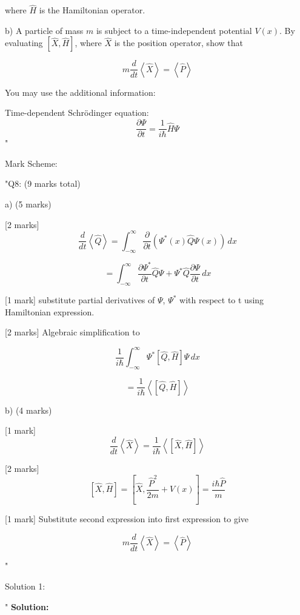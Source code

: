 where \( \hat{H} \) is the Hamiltonian operator. 

b) A particle of mass \( m \) is subject to a time-independent potential \( V(x) \). By evaluating \( \left[ \hat{X}, \hat{H}\right] \), where \( \hat{X} \) is the position operator, show that 

\[ m\frac{d}{dt}\left<\hat{X}\right> = \left<\hat{P}\right> \]

You may use the additional information: 

Time-dependent Schrödinger equation: 
\[ \frac{\partial\Psi}{\partial t} = \frac{1}{i\hbar}\hat{H}\Psi \]"

Mark Scheme:

"{Q8: (9 marks total) }

a) (5 marks)

[2 marks] \[ \frac{d}{dt} \left< \hat{Q} \right> = \int_{-\infty}^{\infty} \frac{\partial}{\partial t} \left( \Psi^{*}(x) \hat{Q} \Psi(x) \right) \, dx \]

\[ = \int_{-\infty}^{\infty} \frac{\partial \Psi^{*}}{\partial t}\hat{Q}\Psi + \Psi^{*}\hat{Q}\frac{\partial \Psi}{\partial t} \, dx \]

[1 mark] substitute partial derivatives of \(\Psi\), \(\Psi^{*}\) with respect to t using Hamiltonian expression.

[2 marks] Algebraic simplification to 

\[ \frac{1}{i\hbar} \int_{-\infty}^{\infty} \Psi^{*} \left [ \hat{Q}, \hat{H} \right ] \Psi \, dx \]

\[ = \frac{1}{i\hbar} \left<  \left [ \hat{Q}, \hat{H} \right ] \right> \]

b) (4 marks)

[1 mark]\[ \frac{d}{dt}  \left<\hat{X}\right> = \frac{1}{i\hbar}\left< \left[ \hat{X}, \hat{H} \right] \right> \] 

[2 marks] \[\left[ \hat{X}, \hat{H}\right] = \left[ \hat{X}, \frac{\hat{P}^{2}}{2m} + V(x)\right] = \frac{i\hbar \hat{P}}{m} \]

[1 mark] Substitute second expression into first expression to give 

\[m \frac{d}{dt}\left<\hat{X}\right> =  \left<\hat{P}\right> \]

"

Solution 1: 

"
\textbf{Solution:}

